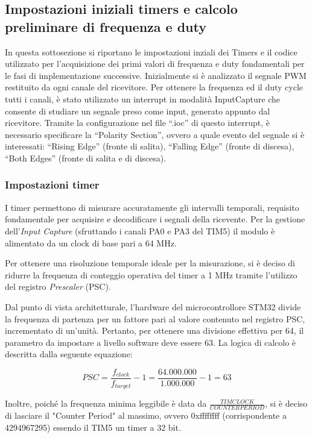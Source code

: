 \documentclass[11pt]{report}
\begin{document}
\subsection{Impostazioni iniziali timers e calcolo preliminare di frequenza e duty}
In questa sottosezione si riportano le impostazioni inziali dei Timers e il codice utilizzato per
l’acquisizione dei primi valori di frequenza e duty fondamentali per le fasi di implementazione
successive.
Inizialmente si è analizzato il segnale PWM restituito da ogni canale del ricevitore. Per
ottenere la frequenza ed il duty cycle tutti i canali, è stato utilizzato un interrupt in modalità
InputCapture che consente di studiare un segnale preso come input, generato appunto dal
ricevitore. Tramite la configurazione nel file “.ioc” di questo interrupt, è necessario specificare
la “Polarity Section”, ovvero a quale evento del segnale si è interessati: “Rising Edge” (fronte
di salita), “Falling Edge” (fronte di discesa), “Both Edges” (fronte di salita e di discesa).

\subsubsection{Impostazioni timer}

I timer permettono di misurare accuratamente gli intervalli temporali, requisito fondamentale per acquisire e decodificare i segnali della ricevente. Per la gestione dell'\textit{Input Capture} (sfruttando i canali PA0 e PA3 del TIM5) il modulo è alimentato da un clock di base pari a 64 MHz.

Per ottenere una risoluzione temporale ideale per la misurazione, si è deciso di ridurre la frequenza di conteggio operativa del timer a 1 MHz tramite l'utilizzo del registro \textit{Prescaler} (PSC). 

Dal punto di vista architetturale, l'hardware del microcontrollore STM32 divide la frequenza di partenza per un fattore pari al valore contenuto nel registro PSC, incrementato di un'unità. Pertanto, per ottenere una divisione effettiva per 64, il parametro da impostare a livello software deve essere 63. La logica di calcolo è descritta dalla seguente equazione:

$$PSC = \frac{f_{clock}}{f_{target}} - 1 = \frac{64.000.000}{1.000.000} - 1 = 63$$

\noindent Inoltre, poiché la frequenza minima leggibile è data da $\frac{TIMCLOCK}{COUNTERPERIOD}$, si è deciso di lasciare il "Counter Period" al massimo, ovvero 0xffffffff (corrispondente a 4294967295) essendo il TIM5 un timer a 32 bit.
\end{document}

